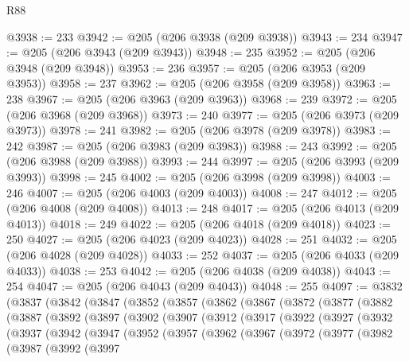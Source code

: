 \begin{lexlean}{R88}
\begin{coremodule}
@3938 := 233
@3942 := @205 (@206 @3938 (@209 @3938))
@3943 := 234
@3947 := @205 (@206 @3943 (@209 @3943))
@3948 := 235
@3952 := @205 (@206 @3948 (@209 @3948))
@3953 := 236
@3957 := @205 (@206 @3953 (@209 @3953))
@3958 := 237
@3962 := @205 (@206 @3958 (@209 @3958))
@3963 := 238
@3967 := @205 (@206 @3963 (@209 @3963))
@3968 := 239
@3972 := @205 (@206 @3968 (@209 @3968))
@3973 := 240
@3977 := @205 (@206 @3973 (@209 @3973))
@3978 := 241
@3982 := @205 (@206 @3978 (@209 @3978))
@3983 := 242
@3987 := @205 (@206 @3983 (@209 @3983))
@3988 := 243
@3992 := @205 (@206 @3988 (@209 @3988))
@3993 := 244
@3997 := @205 (@206 @3993 (@209 @3993))
@3998 := 245
@4002 := @205 (@206 @3998 (@209 @3998))
@4003 := 246
@4007 := @205 (@206 @4003 (@209 @4003))
@4008 := 247
@4012 := @205 (@206 @4008 (@209 @4008))
@4013 := 248
@4017 := @205 (@206 @4013 (@209 @4013))
@4018 := 249
@4022 := @205 (@206 @4018 (@209 @4018))
@4023 := 250
@4027 := @205 (@206 @4023 (@209 @4023))
@4028 := 251
@4032 := @205 (@206 @4028 (@209 @4028))
@4033 := 252
@4037 := @205 (@206 @4033 (@209 @4033))
@4038 := 253
@4042 := @205 (@206 @4038 (@209 @4038))
@4043 := 254
@4047 := @205 (@206 @4043 (@209 @4043))
@4048 := 255
@4097 := @3832
    (@3837
      (@3842
        (@3847
          (@3852
            (@3857
              (@3862
                (@3867
                  (@3872
                    (@3877
                      (@3882
                        (@3887
                          (@3892
                            (@3897
                              (@3902
                                (@3907
                                  (@3912
                                    (@3917
                                      (@3922
                                        (@3927
                                          (@3932
                                            (@3937
                                              (@3942
                                                (@3947
                                                  (@3952
                                                    (@3957
                                                      (@3962
                                                        (@3967
                                                          (@3972
                                                            (@3977
                                                              (@3982
                                                                (@3987
                                                                  (@3992
                                                                    (@3997

\end{coremodule}
\end{lexlean}

